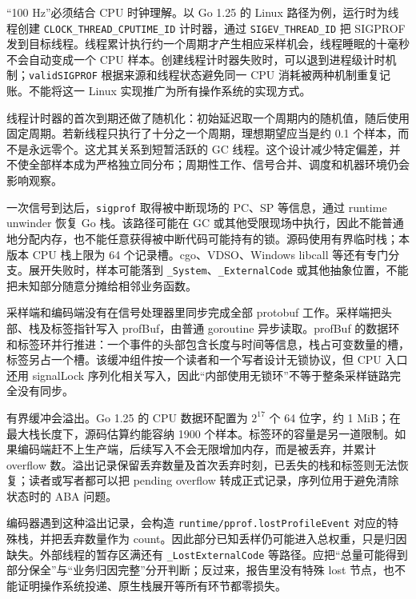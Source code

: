 \documentclass[UTF8,fontset=fandol,openany,11pt]{ctexbook}
\begin{document}
“100 Hz”必须结合 CPU 时钟理解。以 Go 1.25 的 Linux 路径为例，运行时为线程创建 \texttt{CLOCK\_\allowbreak{}THREAD\_\allowbreak{}CPUTIME\_\allowbreak{}ID} 计时器，通过 \texttt{SIGEV\_\allowbreak{}THREAD\_\allowbreak{}ID} 把 SIGPROF 发到目标线程。线程累计执行约一个周期才产生相应采样机会，线程睡眠的十毫秒不会自动变成一个 CPU 样本。创建线程计时器失败时，可以退到进程级计时机制；\texttt{validSIGPROF} 根据来源和线程状态避免同一 CPU 消耗被两种机制重复记账。不能将这一 Linux 实现推广为所有操作系统的实现方式。\cite{pp-cpu-linux}


线程计时器的首次到期还做了随机化：初始延迟取一个周期内的随机值，随后使用固定周期。若新线程只执行了十分之一个周期，理想期望应当是约 0.1 个样本，而不是永远零个。这尤其关系到短暂活跃的 GC 线程。这个设计减少特定偏差，并不使全部样本成为严格独立同分布；周期性工作、信号合并、调度和机器环境仍会影响观察。\cite{pp-cpu-linux}


一次信号到达后，\texttt{sigprof} 取得被中断现场的 PC、SP 等信息，通过 runtime unwinder 恢复 Go 栈。该路径可能在 GC 或其他受限现场中执行，因此不能普通地分配内存，也不能任意获得被中断代码可能持有的锁。源码使用有界临时栈；本版本 CPU 栈上限为 64 个记录槽。cgo、VDSO、Windows libcall 等还有专门分支。展开失败时，样本可能落到 \texttt{\_\allowbreak{}System}、\texttt{\_\allowbreak{}ExternalCode} 或其他抽象位置，不能把未知部分随意分摊给相邻业务函数。\cite{pp-sigprof}\cite{pp-cpu-runtime}


采样端和编码端没有在信号处理器里同步完成全部 protobuf 工作。采样端把头部、栈及标签指针写入 profBuf，由普通 goroutine 异步读取。profBuf 的数据环和标签环并行推进：一个事件的头部包含长度与时间等信息，栈占可变数量的槽，标签另占一个槽。该缓冲组件按一个读者和一个写者设计无锁协议，但 CPU 入口还用 signalLock 序列化相关写入，因此“内部使用无锁环”不等于整条采样链路完全没有同步。\cite{pp-buffer}\cite{pp-cpu-runtime}


有界缓冲会溢出。Go 1.25 的 CPU 数据环配置为 \(2^{17}\) 个 64 位字，约 1 MiB；在最大栈长度下，源码估算约能容纳 1900 个样本。标签环的容量是另一道限制。如果编码端赶不上生产端，后续写入不会无限增加内存，而是被丢弃，并累计 overflow 数。溢出记录保留丢弃数量及首次丢弃时刻，已丢失的栈和标签则无法恢复；读者或写者都可以把 pending overflow 转成正式记录，序列位用于避免清除状态时的 ABA 问题。\cite{pp-cpu-runtime}\cite{pp-buffer}


编码器遇到这种溢出记录，会构造 \texttt{runtime/\allowbreak{}pprof.\allowbreak{}lostProfileEvent} 对应的特殊栈，并把丢弃数量作为 count。因此部分已知丢样仍可能进入总权重，只是归因缺失。外部线程的暂存区满还有 \texttt{\_\allowbreak{}LostExternalCode} 等路径。应把“总量可能得到部分保全”与“业务归因完整”分开判断；反过来，报告里没有特殊 lost 节点，也不能证明操作系统投递、原生栈展开等所有环节都零损失。\cite{pp-cpu-builder}\cite{pp-cpu-runtime}
\end{document}
